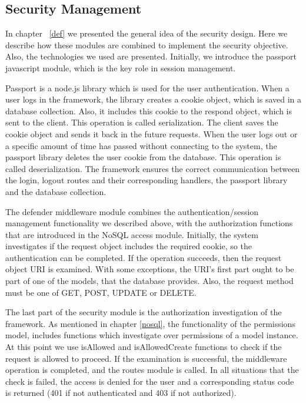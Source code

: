 \subsection{Security Management}
In chapter ~\ref{def} we presented the general idea of the security design. Here we describe how these modules are combined to implement the security objective. Also, the technologies we used are presented. Initially, we introduce the passport javascript module, which is the key role in session management. \par
	Passport is a node.js library which is used for the user authentication. When a user logs in the framework, the library creates a cookie object, which is saved in a database collection. Also, it includes this cookie to the respond object, which is sent to the client. This operation is called serialization. The client saves the cookie object and sends it back in the future requests. When the user logs out or a specific amount of time has passed without connecting to the system, the passport library deletes the user cookie from the database. This operation is called deserialization. The framework ensures the correct communication between the login, logout routes and their corresponding handlers, the passport library and the database collection. \par 
	The defender middleware module combines the authentication/session management functionality we described above, with the authorization functions that are introduced in the NoSQL access module. Initially, the system investigates if the request object includes the required cookie, so the authentication can be completed. If the operation succeeds, then the request object URI is examined. With some exceptions, the URI's first part ought to be part of one of the models, that the database provides. Also, the request method must be one of GET, POST, UPDATE or DELETE. \par 
	The last part of the security module is the authorization investigation of the framework. As mentioned in chapter \ref{nosql}, the functionality of the permissions model, includes functions which investigate over permissions of a model instance. At this point we use isAllowed and isAllowedCreate functions to check if the request is allowed to proceed. If the examination is successful, the middleware operation is completed, and the routes module is called. In all situations that the check is failed, the access is denied for the user and a corresponding status code is returned (401 if not authenticated and 403 if not authorized).

